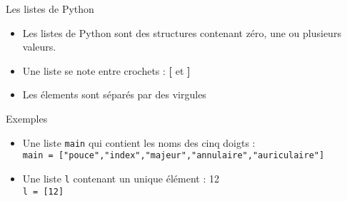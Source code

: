 \documentclass[10pt]{beamer}
\begin{document}
\begin{frame}
	\mframe{\Python}
	\begin{center}
		\begin{alertblock}{Les listes de Python}
			\begin{itemize}
				\item<1-> Les listes de Python sont des structures contenant  zéro, une ou plusieurs valeurs.
				\item<2-> Une liste se note entre crochets : \textbf{[} et \textbf{]}
				\item<3-> Les élements sont séparés par des virgules
			\end{itemize}
		\end{alertblock}
		\begin{exampleblock}{Exemples}
			\begin{itemize}
				\item<4-> Une liste {\tt main} qui contient les noms des cinq doigts : \\
				      \onslide<5-> {\tt main = ["pouce","index","majeur","annulaire","auriculaire"]}
				\item<6-> Une liste {\tt l} contenant un unique élément : 12 \\
				      \onslide<5-> {\tt l = [12]}
			\end{itemize}
		\end{exampleblock}
	\end{center}
\end{frame}
\end{document}
